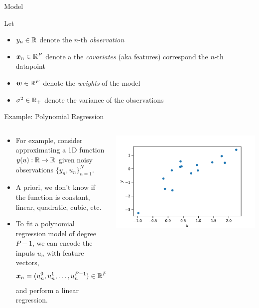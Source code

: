 \documentclass[aspectratio=169]{beamer}
\begin{document}
\begin{frame}{Model}

Let 
\begin{itemize}
    \item $y_n \in \mathbb{R}$ denote the $n$-th \textit{observation}
    \item $\boldsymbol{x}_n \in \mathbb{R}^P$ denote a the \textit{covariates} (aka features) correspond the $n$-th datapoint
    \item $\boldsymbol{w} \in \mathbb{R}^P$ denote the \textit{weights} of the model
    \item $\sigma^2 \in \mathbb{R}_+$ denote the variance of the observations
\end{itemize}

\end{frame}

\begin{frame}{Example: Polynomial Regression}
\begin{columns}
\begin{column}{0.5\textwidth}
\begin{itemize}
\item For example, consider approximating a 1D function $y(u): \mathbb{R} \to \mathbb{R}$ given noisy observations $\{y_n, u_n\}_{n=1}^N$. 

\item A priori, we don't know if the function is constant, linear, quadratic, cubic, etc. 

\item To fit a polynomial regression model of degree $P-1$, we can encode the inputs $u_n$ with feature vectors,
\begin{align}
    \boldsymbol{x}_n = (u_n^0, u_n^1, \ldots, u_n^{P-1}) \in \mathbb{R}^{P}
\end{align}
and perform a linear regression.

\end{itemize}
\end{column}

\begin{column}{0.5\textwidth}
    \centering
    \includegraphics[width=\linewidth]{figures/lap1/data.pdf}
\end{column}
\end{columns}
\end{frame}
\end{document}
